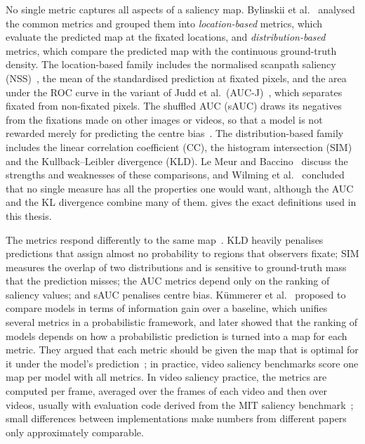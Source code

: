 No single metric captures all aspects of a saliency map. Bylinskii et
al.~\cite{bylinskii2019metrics} analysed the common metrics and grouped them into
\emph{location-based} metrics, which evaluate the predicted map at the fixated
locations, and \emph{distribution-based} metrics, which compare the predicted map
with the continuous ground-truth density. The location-based family includes the
normalised scanpath saliency (\acrshort{NSS})~\cite{peters2005components}, the mean of the
standardised prediction at fixated pixels, and the area under the \acrshort{ROC} curve in
the variant of Judd et al.\ (\acrshort{AUC-J})~\cite{judd2009learning}, which separates
fixated from non-fixated pixels. The shuffled \acrshort{AUC} (\acrshort{sAUC}) draws its negatives
from the fixations made on other images or videos, so that a model is not
rewarded merely for predicting the centre
bias~\cite{zhang2008sun,borji2013quantitative}. The distribution-based family
includes the linear correlation coefficient (\acrshort{CC}), the histogram intersection
(\acrshort{SIM}) and the Kullback--Leibler divergence (\acrshort{KLD}). Le Meur and
Baccino~\cite{lemeur2013methods} discuss the strengths and weaknesses of these
comparisons, and Wilming et al.~\cite{wilming2011measures} concluded that no
single measure has all the properties one would want, although the \acrshort{AUC} and the
\acrshort{KL} divergence combine many of them.  gives the exact
definitions used in this thesis.

The metrics respond differently to the same map~\cite{bylinskii2019metrics}.
\acrshort{KLD} heavily penalises predictions that assign almost no probability to regions
that observers fixate; \acrshort{SIM} measures the overlap of two distributions and is
sensitive to ground-truth mass that the prediction misses; the \acrshort{AUC} metrics
depend only on the ranking of saliency values; and \acrshort{sAUC} penalises centre bias.
K\"ummerer et al.~\cite{kummerer2015information} proposed to compare models in
terms of information gain over a baseline, which unifies several metrics in a
probabilistic framework, and later showed that the ranking of models depends on
how a probabilistic prediction is turned into a map for each metric. They argued
that each metric should be given the map that is optimal for it under the
model's prediction~\cite{kummerer2018saliency}; in practice, video saliency
benchmarks score one map per model with all metrics.
In video saliency practice, the metrics are computed per frame, averaged over
the frames of each video and then over videos, usually with evaluation code
derived from the MIT saliency benchmark~\cite{bylinskii2019metrics}; small
differences between implementations make numbers from different papers only
approximately comparable.

